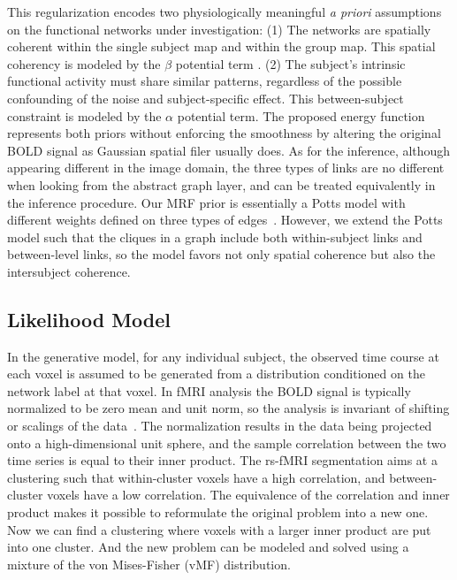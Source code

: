 \documentclass[review,authoryear]{elsarticle}
\begin{document}
This regularization encodes two physiologically meaningful \emph{a priori}
assumptions on the functional networks under investigation: (1) The networks are
spatially coherent within the single subject map and within the group map. This
spatial coherency is modeled by the $\beta$ potential term . (2) The subject's
intrinsic functional activity must share similar patterns, regardless of the
possible confounding of the noise and subject-specific effect. This
between-subject constraint is modeled by the $\alpha$ potential term. The
proposed energy function represents both priors without enforcing the smoothness
by altering the original BOLD signal as Gaussian spatial filer usually does. As
for the inference, although appearing different in the image domain, the three
types of links are no different when looking from the abstract graph layer, and
can be treated equivalently in the inference procedure.  Our MRF prior is
essentially a Potts model with different weights defined on three types of
edges~\citep{potts1952some}. However, we extend the Potts model such that the
cliques in a graph include both within-subject links and between-level links, so
the model favors not only spatial coherence but also the intersubject coherence.

\subsection{Likelihood Model}
In the generative model, for any individual subject, the observed time course at
each voxel is assumed to be generated from a distribution conditioned on the
network label at that voxel. In fMRI analysis the BOLD signal is typically
normalized to be zero mean and unit norm, so the analysis is invariant of
shifting or scalings of the data~\citep{golland2008spatial}. The normalization
results in the data being projected onto a high-dimensional unit sphere, and the
sample correlation between the two time series is equal to their inner
product. The rs-fMRI segmentation aims at a clustering such that within-cluster
voxels have a high correlation, and between-cluster voxels have a low
correlation. The equivalence of the correlation and inner product makes it
possible to reformulate the original problem into
a new one. Now we can find a clustering where voxels with a larger inner
product are put into one cluster. And the new problem can be modeled and solved
using a mixture of the von Mises-Fisher (vMF) distribution.
\end{document}
